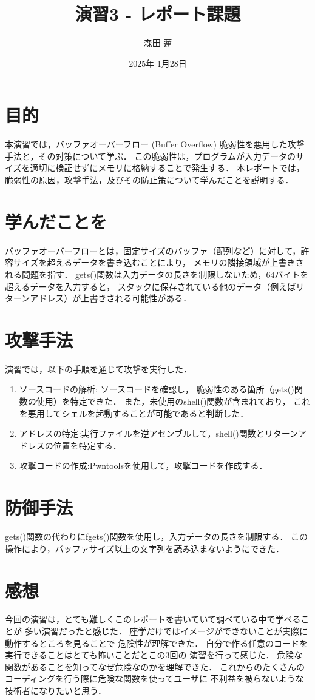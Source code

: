 \documentclass{jlreq}
\title{演習3 - レポート課題}
\author{森田 蓮}
\date{2025年 1月28日}
\begin{document}
\maketitle

\section{目的}
本演習では，バッファオーバーフロー (Buffer Overflow) 脆弱性を悪用した攻撃手法と，その対策について学ぶ．
この脆弱性は，プログラムが入力データのサイズを適切に検証せずにメモリに格納することで発生する．
本レポートでは，脆弱性の原因，攻撃手法，及びその防止策について学んだことを説明する．

\section{学んだことを}
バッファオーバーフローとは，固定サイズのバッファ（配列など）に対して，許容サイズを超えるデータを書き込むことにより，
メモリの隣接領域が上書きされる問題を指す．
gets()関数は入力データの長さを制限しないため，64バイトを超えるデータを入力すると，
スタックに保存されている他のデータ（例えばリターンアドレス）が上書きされる可能性がある．

\section{攻撃手法}
演習では，以下の手順を通じて攻撃を実行した．
\begin{enumerate}
    \item ソースコードの解析: ソースコードを確認し，
    脆弱性のある箇所（gets()関数の使用）を特定できた．
    また，未使用のshell()関数が含まれており，
    これを悪用してシェルを起動することが可能であると判断した．
    \item アドレスの特定:実行ファイルを逆アセンブルして，shell()関数とリターンアドレスの位置を特定する．
    \item 攻撃コードの作成:Pwntoolsを使用して，攻撃コードを作成する．
\end{enumerate}

\section{防御手法}
gets()関数の代わりにfgets()関数を使用し，入力データの長さを制限する．
この操作により，バッファサイズ以上の文字列を読み込まないようにできた．

\section{感想}
今回の演習は，とても難しくこのレポートを書いていて調べている中で学べることが
多い演習だったと感じた．
座学だけではイメージができないことが実際に動作するところを見ることで
危険性が理解できた．
自分で作る任意のコードを実行できることはとても怖いことだとこの3回の
演習を行って感じた．
危険な関数があることを知ってなぜ危険なのかを理解できた．
これからのたくさんのコーディングを行う際に危険な関数を使ってユーザに
不利益を被らないような技術者になりたいと思う．
\end{document}
